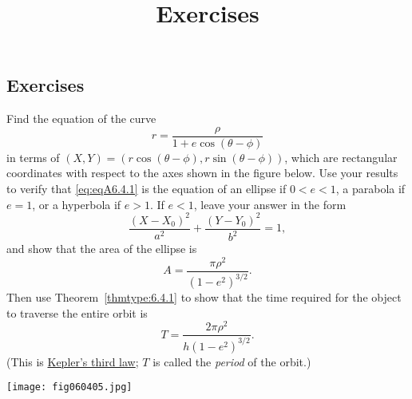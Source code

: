 \documentclass{ximera}
\title{Exercises} \license{CC BY-NC-SA 4.0}
\begin{document}
\begin{abstract}
\end{abstract}
\maketitle

\begin{onlineOnly}
\section*{Exercises}
\end{onlineOnly}


\begin{problem}\label{exer:6.4.1}
Find the equation of the curve
\begin{equation}\label{eq:eqA6.4.1}
r=\frac{\rho}{1+e\cos(\theta-\phi)}
\end{equation}
in terms of
$(X,Y)=\left(r\cos(\theta-\phi),r\sin(\theta-\phi)\right)$,
which are rectangular coordinates with respect to the axes shown in the
figure below. %
Use your results to verify that
\ref{eq:eqA6.4.1}
is the equation of an ellipse if $0<e<1$, a parabola if $e=1$,
or a hyperbola if $e>1$. If $e<1$, leave your answer in
the form
$$
 \frac{(X-X_0)^2}{a^2}+\frac{(Y-Y_0)^2}{b^2}=1,
$$
and show that the area of the ellipse is
$$
A=\frac{\pi\rho^2}{(1-e^2)^{3/2}}.
$$
Then use Theorem~\ref{thmtype:6.4.1} to show that the time required for
the object to traverse the entire orbit is
$$
T=\frac{2\pi\rho^2}{h(1-e^2)^{3/2}}.
$$
(This is
\href{http://www-history.mcs.st-and.ac.uk/Mathematicians/Kepler.html}
{Kepler's third law};   $T$ is called the
\emph{period} of the orbit.)


\begin{image}
  \texttt{[image: fig060405.jpg]}
\end{image}
\end{problem}
\end{document}
